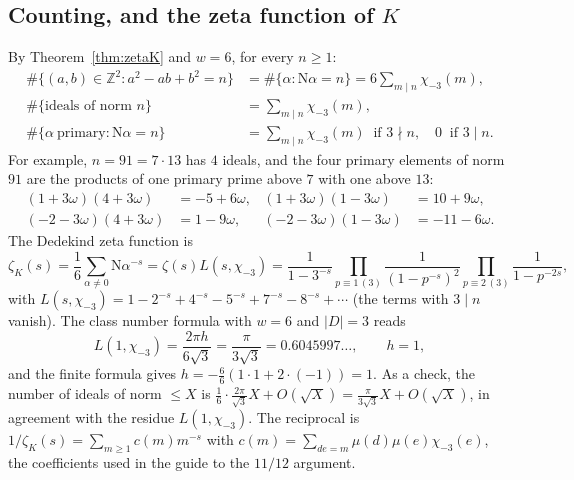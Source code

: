 \documentclass[11pt]{article}
\numberwithin{equation}{section}
\newcommand{\N}{\mathrm N}
\newcommand{\Z}{\mathbb Z}
\newcommand{\ch}{\chi_{-3}}
\theoremstyle{definition}
\theoremstyle{remark}
\begin{document}
\subsection{Counting, and the zeta function of \texorpdfstring{$K$}{K}}
By Theorem~\ref{thm:zetaK} and $w=6$, for every $n\ge1$:
\begin{align}
 \#\{(a,b)\in\Z^2:a^2-ab+b^2=n\}&=\#\{\alpha:\N\alpha=n\}=6\sum_{m\mid n}\ch(m),\label{eq:countall}\\
 \#\{\text{ideals of norm }n\}&=\sum_{m\mid n}\ch(m),\label{eq:countideals}\\
 \#\{\alpha\ \text{primary}:\N\alpha=n\}&=\textstyle\sum_{m\mid n}\ch(m)\ \text{ if }3\nmid n,\quad 0\ \text{ if }3\mid n.\label{eq:countprimary}
\end{align}
For example, $n=91=7\cdot13$ has $4$ ideals, and the four primary elements of norm $91$ are
the products of one primary prime above $7$ with one above $13$:
\begin{equation}\label{eq:norm91}
\begin{aligned}
 (1+3\omega)(4+3\omega)&=-5+6\omega, & (1+3\omega)(1-3\omega)&=10+9\omega,\\
 (-2-3\omega)(4+3\omega)&=1-9\omega, & (-2-3\omega)(1-3\omega)&=-11-6\omega .
\end{aligned}
\end{equation}
The Dedekind zeta function is
\begin{equation}\label{eq:zetaK}
 \zeta_K(s)=\frac16\sum_{\alpha\ne0}\N\alpha^{-s}=\zeta(s)L(s,\ch)
 =\frac1{1-3^{-s}}\prod_{p\equiv1\,(3)}\frac1{(1-p^{-s})^2}\prod_{p\equiv2\,(3)}\frac1{1-p^{-2s}},
\end{equation}
with $L(s,\ch)=1-2^{-s}+4^{-s}-5^{-s}+7^{-s}-8^{-s}+\cdots$ (the terms with $3\mid n$ vanish). The class number formula with
$w=6$ and $|D|=3$ reads
\begin{equation}\label{eq:cnfm3}
 L(1,\ch)=\frac{2\pi h}{6\sqrt3}=\frac{\pi}{3\sqrt3}=0.6045997\ldots,\qquad h=1,
\end{equation}
and the finite formula gives $h=-\frac{6}{6}(1\cdot1+2\cdot(-1))=1$. As a check, the number
of ideals of norm $\le X$ is $\frac16\cdot\frac{2\pi}{\sqrt3}X+O(\sqrt X)=\frac{\pi}{3\sqrt3}X+O(\sqrt X)$,
in agreement with the residue $L(1,\ch)$. The reciprocal is
$1/\zeta_K(s)=\sum_{m\ge1}c(m)m^{-s}$ with $c(m)=\sum_{de=m}\mu(d)\mu(e)\ch(e)$, the coefficients
used in the guide to the $11/12$ argument.
\end{document}
